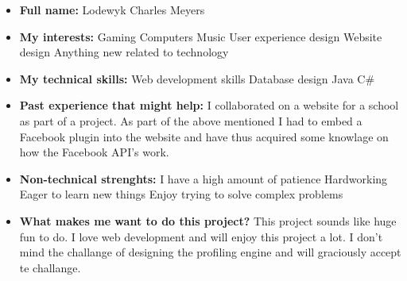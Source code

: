 \documentclass{article}
\begin{document}
	\begin{itemize}
		\item \textbf{Full name:} Lodewyk Charles Meyers
		\item \textbf{My interests:}
			\subitem Gaming
			\subitem Computers
			\subitem Music
			\subitem User experience design
			\subitem Website design
			\subitem Anything new related to technology
		\item \textbf{My technical skills:}
			\subitem Web development skills
			\subitem Database design
			\subitem Java
			\subitem C\#
		\item \textbf{Past experience that might help:}
			\subitem I collaborated on a website for a school as part of a project.
			\subitem As part of the above mentioned I had to embed a Facebook plugin into the website and have thus acquired some knowlage on how the Facebook API's work.
		\item \textbf{Non-technical strenghts:}
			\subitem I have a high amount of patience
			\subitem Hardworking
			\subitem Eager to learn new things
			\subitem Enjoy trying to solve complex problems
		\item \textbf{What makes me want to do this project?} This project sounds like huge fun to do. I love web development and will enjoy this project a lot. I don't mind the challange of designing the profiling engine and will graciously accept te challange.
	\end{itemize}
	
\end{document}
